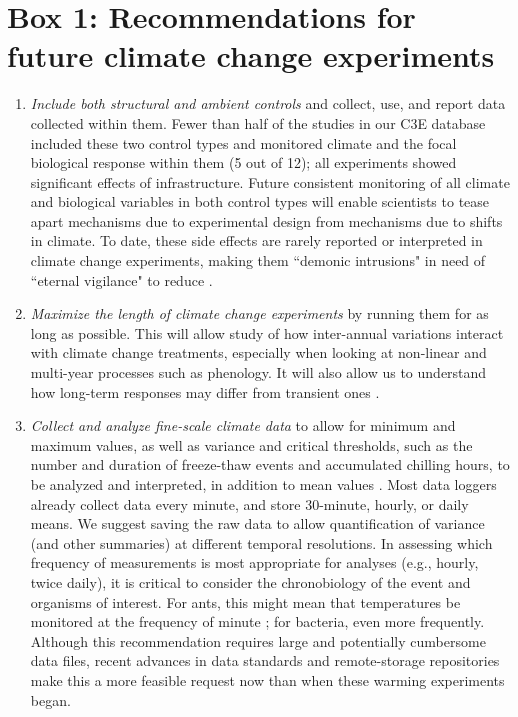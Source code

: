 \documentclass{article}
\begin{document}
\section* {Box 1: Recommendations for future climate change experiments} 
\begin{enumerate}
\item\textit{Include both structural and ambient controls} and collect, use, and report data collected within them. Fewer than half of the studies in our C3E database included these two control types and monitored climate and the focal biological response within them (5 out of 12); all experiments showed significant effects of infrastructure. Future consistent monitoring of all climate and biological variables in both control types will enable scientists to tease apart mechanisms due to experimental design from mechanisms due to shifts in climate. To date, these side effects are rarely reported or interpreted in climate change experiments, making them ``demonic intrusions" in need of ``eternal vigilance" to reduce \citep{hurlbert1984}. 
\item\textit{Maximize the length of climate change experiments} by running them for as long as possible. This will allow study of how inter-annual variations interact with climate change treatments, especially when looking at non-linear and multi-year processes such as phenology. It will also allow us to understand how long-term responses may differ from transient ones \citep{saleska2002,franklin1989,giasson2013,harte2015}. %
\item\textit{Collect and analyze fine-scale climate data} to allow for minimum and maximum values, as well as variance and critical thresholds, such as the number and duration of freeze-thaw events and accumulated chilling hours, to be analyzed and interpreted, in addition to mean values \citep{mcdaniel2014,vasseur2014}. Most data loggers already collect data every minute, and store 30-minute, hourly, or daily means. We suggest saving the raw data to allow quantification of variance (and other summaries) at different temporal resolutions. In assessing which frequency of measurements is most appropriate for analyses (e.g., hourly, twice daily), it is critical to consider the chronobiology of the event and organisms of interest. For ants, this might mean that temperatures be monitored at the frequency of minute \citep{shavit2017}; for bacteria, even more frequently. Although this recommendation requires large and potentially cumbersome data files, recent advances in data standards and remote-storage repositories make this a more feasible request now than when these warming experiments began.

\end{enumerate}
\end{document}
